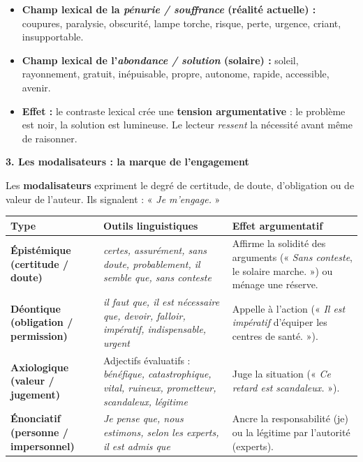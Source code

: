 \documentclass[11pt]{article}
\begin{document}
\begin{exemplebox}
\begin{itemize}
    \item \textbf{Champ lexical de la \emph{pénurie / souffrance} (réalité actuelle) :} coupures, paralysie, obscurité, lampe torche, risque, perte, urgence, criant, insupportable.
    \item \textbf{Champ lexical de l'\emph{abondance / solution} (solaire) :} soleil, rayonnement, gratuit, inépuisable, propre, autonome, rapide, accessible, avenir.
    \item \textbf{Effet :} le contraste lexical crée une \textbf{tension argumentative} : le problème est noir, la solution est lumineuse. Le lecteur \emph{ressent} la nécessité avant même de raisonner.
\end{itemize}
\end{exemplebox}

\textbf{3. Les modalisateurs : la marque de l'engagement}\par

Les \textbf{modalisateurs} expriment le degré de certitude, de doute, d'obligation ou de valeur de l'auteur. Ils signalent : « \emph{Je m'engage.} »

\begin{center}
\begin{tabularx}{\linewidth}{|l|X|X|}\hline
\rowcolor{poppurpleL}
\textbf{Type} & \textbf{Outils linguistiques} & \textbf{Effet argumentatif} \\ \hline
\textbf{Épistémique (certitude / doute)} & \emph{certes, assurément, sans doute, probablement, il semble que, sans conteste} & Affirme la solidité des arguments (« \emph{Sans conteste}, le solaire marche. ») ou ménage une réserve. \\ \hline
\textbf{Déontique (obligation / permission)} & \emph{il faut que, il est nécessaire que, devoir, falloir, impératif, indispensable, urgent} & Appelle à l'action (« \emph{Il est impératif} d'équiper les centres de santé. »). \\ \hline
\textbf{Axiologique (valeur / jugement)} & Adjectifs évaluatifs : \emph{bénéfique, catastrophique, vital, ruineux, prometteur, scandaleux, légitime} & Juge la situation (« \emph{Ce retard est scandaleux.} »). \\ \hline
\textbf{Énonciatif (personne / impersonnel)} & \emph{Je pense que, nous estimons, selon les experts, il est admis que} & Ancre la responsabilité (je) ou la légitime par l'autorité (experts). \\ \hline
\end{tabularx}
\end{center}
\end{document}
